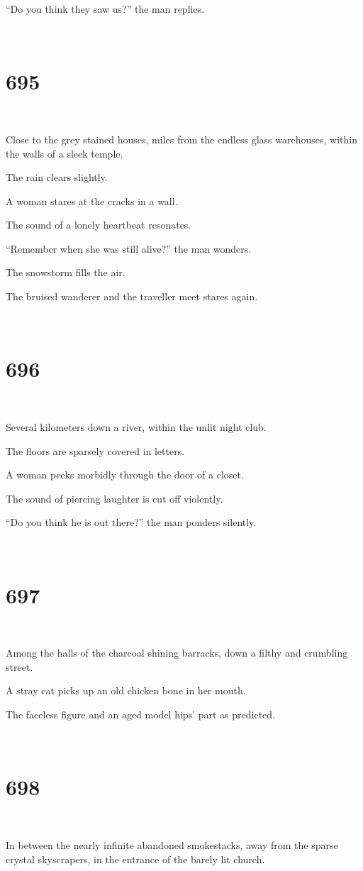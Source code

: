 \documentclass{report}
\begin{document}
``Do you think they saw us?'' the man replies.

~
\chapter*{695}
~

Close to the grey stained houses, miles from the endless glass warehouses, within the walls of a sleek temple.

The rain clears slightly.

A woman stares at the cracks in a wall.

The sound of a lonely heartbeat resonates.

``Remember when she was still alive?'' the man wonders.

The snowstorm fills the air.

The bruised wanderer and the traveller meet stares again.

~
\chapter*{696}
~

Several kilometers down a river, within the unlit night club.

The floors are sparsely covered in letters.

A woman peeks morbidly through the door of a closet.

The sound of piercing laughter is cut off violently.

``Do you think he is out there?'' the man ponders silently.

~
\chapter*{697}
~

Among the halls of the charcoal shining barracks, down a filthy and crumbling street.

A stray cat picks up an old chicken bone in her mouth.

The faceless figure and an aged model hips' part as predicted.

~
\chapter*{698}
~

In between the nearly infinite abandoned smokestacks, away from the sparse crystal skyscrapers, in the entrance of the barely lit church.
\end{document}
